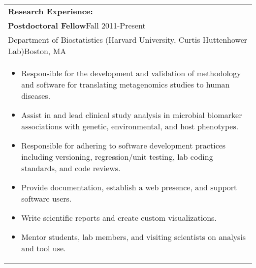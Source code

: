 \documentclass[12pt]{report}
\def\fullLength{6.5in}
\begin{document}
\vspace{-12.0mm}

\section*{ }
\begin{spacing}{0.9}
\end{spacing}

\clearpage

\begin{table}[!ht]
\begin{tabular}{p{\fullLength}}
\textbf{\Large Research Experience:}\\
\textbf{Postdoctoral Fellow}\hfill Fall 2011-Present\\
Department of Biostatistics (Harvard University, Curtis Huttenhower Lab)\hfill Boston, MA\\
\vspace{-7.0mm}
\begin{itemize}\addtolength{\itemsep}{-0.5\baselineskip}
\item Responsible for the development and validation of methodology and software for translating metagenomics studies to human diseases.
\item Assist in and lead clinical study analysis in microbial biomarker associations with genetic, environmental, and host phenotypes.
\item Responsible for adhering to software development practices including versioning, regression/unit testing, lab coding standards, and code reviews.
\item Provide documentation, establish a web presence, and support software users.
\item Write scientific reports and create custom visualizations.
\item Mentor students, lab members, and visiting scientists on analysis and tool use.
\end{itemize}
\end{tabular}
\end{table}

\vspace{-5.0mm}
\end{document}
